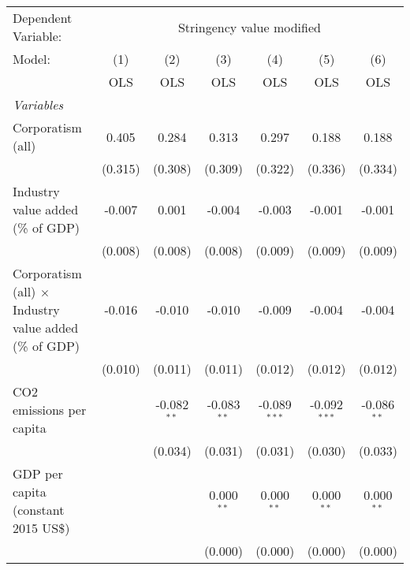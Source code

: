
\begingroup
\centering
\begin{tabular}{lcccccc}
   \toprule
   Dependent Variable: & \multicolumn{6}{c}{Stringency value modified}\\
   Model:                                                        & (1)     & (2)           & (3)           & (4)            & (5)            & (6)\\  
                                                                 &  OLS    & OLS           & OLS           & OLS            & OLS            & OLS\\  
   \midrule
   \emph{Variables}\\
   Corporatism (all)                                             & 0.405   & 0.284         & 0.313         & 0.297          & 0.188          & 0.188\\   
                                                                 & (0.315) & (0.308)       & (0.309)       & (0.322)        & (0.336)        & (0.334)\\   
   Industry value added (\% of GDP)                              & -0.007  & 0.001         & -0.004        & -0.003         & -0.001         & -0.001\\   
                                                                 & (0.008) & (0.008)       & (0.008)       & (0.009)        & (0.009)        & (0.009)\\   
   Corporatism (all) $\times$ Industry value added (\% of GDP)   & -0.016  & -0.010        & -0.010        & -0.009         & -0.004         & -0.004\\   
                                                                 & (0.010) & (0.011)       & (0.011)       & (0.012)        & (0.012)        & (0.012)\\   
   CO2 emissions per capita                                      &         & -0.082$^{**}$ & -0.083$^{**}$ & -0.089$^{***}$ & -0.092$^{***}$ & -0.086$^{**}$\\   
                                                                 &         & (0.034)       & (0.031)       & (0.031)        & (0.030)        & (0.033)\\   
   GDP per capita (constant 2015 US\$)                           &         &               & 0.000$^{**}$  & 0.000$^{**}$   & 0.000$^{**}$   & 0.000$^{**}$\\   
                                                                 &         &               & (0.000)       & (0.000)        & (0.000)        & (0.000)\\   

\end{tabular}
